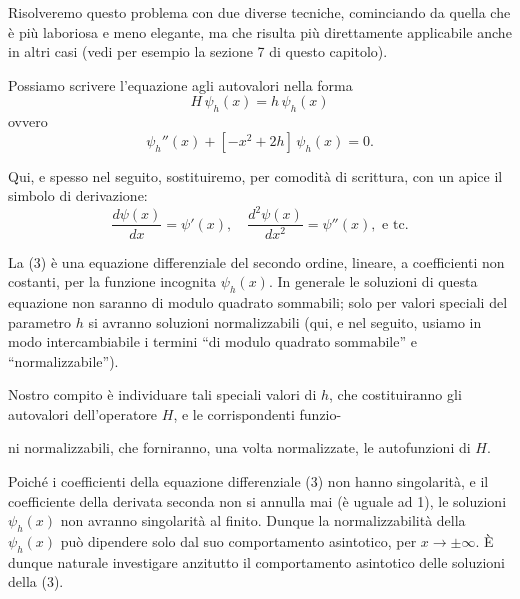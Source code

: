 \documentclass[11pt, a4paper]{book}
\numberwithin{equation}{section}
\begin{document}
Risolveremo questo problema con due diverse tecniche, cominciando da
quella che è più laboriosa e meno elegante, ma che risulta più
direttamente applicabile anche in altri casi (vedi per esempio la
sezione 7 di questo capitolo).

Possiamo scrivere l'equazione agli autovalori nella forma
\begin{equation}
H\,\psi_h(x) = h\,\psi_h(x)
\end{equation}
ovvero
\begin{equation}
\psi_h''(x) + [-x^2 + 2h]\,\psi_h(x) = 0.
\end{equation}

Qui, e spesso nel seguito, sostituiremo, per comodità di scrittura, con
un apice il simbolo di derivazione:
\begin{equation}
\frac{d\psi(x)}{dx} = \psi'(x), \quad \frac{d^2\psi(x)}{dx^2} =
\psi''(x), \text{ e tc.}
\end{equation}

La (3) è una equazione differenziale del secondo ordine, lineare, a
coefficienti non costanti, per la funzione incognita $\psi_h(x)$. In
generale le soluzioni di questa equazione non saranno di modulo quadrato
sommabili; solo per valori speciali del parametro $h$ si avranno
soluzioni normalizzabili (qui, e nel seguito, usiamo in modo
intercambiabile i termini ``di modulo quadrato sommabile'' e
``normalizzabile'').

Nostro compito è individuare tali speciali valori di $h$, che
costituiranno gli autovalori dell'operatore $H$, e le corrispondenti funzio-


ni normalizzabili, che forniranno, una volta normalizzate, le autofunzioni
di $H$.

Poiché i coefficienti della equazione differenziale (3) non hanno
singolarità, e il coefficiente della derivata seconda non si annulla mai
(è uguale ad 1), le soluzioni $\psi_h(x)$ non avranno singolarità al
finito. Dunque la normalizzabilità della $\psi_h(x)$ può dipendere solo
dal suo comportamento asintotico, per $x \to \pm\infty$. È dunque
naturale investigare anzitutto il comportamento asintotico delle
soluzioni della (3).
\end{document}
